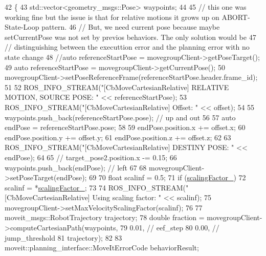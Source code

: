 \begin{DoxyCode}
42 \{
43   std::vector<geometry\_msgs::Pose> waypoints;
44 
45   \textcolor{comment}{// this one was working fine but the issue is that for relative motions it grows up on ABORT-State-Loop
       pattern. }
46   \textcolor{comment}{// But, we need current pose because maybe setCurrentPose was not set by previos behaviors. The only
       solution would be }
47   \textcolor{comment}{// distinguishing between the executtion error and the planning error with no state change}
48   \textcolor{comment}{//auto referenceStartPose = movegroupClient->getPoseTarget(); }
49   \textcolor{keyword}{auto} referenceStartPose = movegroupClient->getCurrentPose();
50   movegroupClient->setPoseReferenceFrame(referenceStartPose.header.frame\_id);
51 
52   ROS\_INFO\_STREAM(\textcolor{stringliteral}{"[CbMoveCartesianRelative] RELATIVE MOTION, SOURCE POSE: "} << referenceStartPose);
53   ROS\_INFO\_STREAM(\textcolor{stringliteral}{"[CbMoveCartesianRelative] Offset: "} << offset);
54 
55   waypoints.push\_back(referenceStartPose.pose);  \textcolor{comment}{// up and out}
56 
57   \textcolor{keyword}{auto} endPose = referenceStartPose.pose;
58 
59   endPose.position.x += offset.x;
60   endPose.position.y += offset.y;
61   endPose.position.z += offset.z;
62 
63   ROS\_INFO\_STREAM(\textcolor{stringliteral}{"[CbMoveCartesianRelative] DESTINY POSE: "} << endPose);
64 
65   \textcolor{comment}{// target\_pose2.position.x -= 0.15;}
66   waypoints.push\_back(endPose);  \textcolor{comment}{// left}
67 
68   movegroupClient->setPoseTarget(endPose);
69 
70   \textcolor{keywordtype}{float} scalinf = 0.5;
71   \textcolor{keywordflow}{if} (\hyperlink{classcl__move__group__interface_1_1CbMoveCartesianRelative_a2b5e5f05bce94dd3078abfd306c6ef39}{scalingFactor\_})
72     scalinf = *\hyperlink{classcl__move__group__interface_1_1CbMoveCartesianRelative_a2b5e5f05bce94dd3078abfd306c6ef39}{scalingFactor\_};
73 
74   ROS\_INFO\_STREAM(\textcolor{stringliteral}{"[CbMoveCartesianRelative] Using scaling factor: "} << scalinf);
75   movegroupClient->setMaxVelocityScalingFactor(scalinf);
76 
77   moveit\_msgs::RobotTrajectory trajectory;
78   \textcolor{keywordtype}{double} fraction = movegroupClient->computeCartesianPath(waypoints,
79                                                           0.01,  \textcolor{comment}{// eef\_step}
80                                                           0.00,  \textcolor{comment}{// jump\_threshold}
81                                                           trajectory);
82 
83   moveit::planning\_interface::MoveItErrorCode behaviorResult;

\end{DoxyCode}
